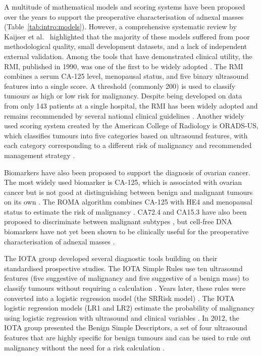 A multitude of mathematical models and scoring systems have been proposed over the years to support the preoperative characterisation of adnexal masses (Table~\ref{tab:intro:models}). However, a comprehensive systematic review by Kaijser et al.\ \cite{kaijserPresurgicalDiagnosisAdnexal2014} highlighted that the majority of these models suffered from poor methodological quality, small development datasets, and a lack of independent external validation. Among the tools that have demonstrated clinical utility, the \gls{RMI}, published in 1990, was one of the first to be widely adopted \cite{jacobsRiskMalignancyIndex1990}. The \gls{RMI} combines a serum CA-125 level, menopausal status, and five binary ultrasound features into a single score. A threshold (commonly 200) is used to classify tumours as high or low risk for malignancy. Despite being developed on data from only 143 patients at a single hospital, the \gls{RMI} has been widely adopted and remains recommended by several national clinical guidelines \cite{timmermanESGOISUOGIOTA2021}. Another widely used scoring system created by the American College of Radiology is \gls{ORADS}-US, which classifies tumours into five categories based on ultrasound features, with each category corresponding to a different risk of malignancy and recommended management strategy \cite{andreottiORADSUSRisk2020}. 

Biomarkers have also been proposed to support the diagnosis of ovarian cancer. The most widely used biomarker is CA-125, which is associated with ovarian cancer but is not good at distinguishing between benign and malignant tumours on its own \cite{mossRoleCA125Clinical2005}. The ROMA algorithm combines CA-125 with HE4 and menopausal status to estimate the risk of malignancy \cite{mooreUseMultipleNovel2008}. CA72.4 and CA15.3 have also been proposed to discriminate between malignant subtypes \cite{coosemansAddedValueSerum2025}, but cell-free DNA biomarkers have not yet been shown to be clinically useful for the preoperative characterisation of adnexal masses \cite{vandersticheleAddedValueCellfree2025}. 

The \gls{IOTA} group developed several diagnostic tools building on their standardised prospective studies. The \gls{IOTA} Simple Rules use ten ultrasound features (five suggestive of malignancy and five suggestive of a benign mass) to classify tumours without requiring a calculation \cite{timmermanSimpleUltrasoundbasedRules2008}. Years later, these rules were converted into a logistic regression model (the SRRisk model) \cite{timmermanPredictingRiskMalignancy2016}. The \gls{IOTA} logistic regression models (\gls{LR1} and \gls{LR2}) estimate the probability of malignancy using logistic regression with ultrasound and clinical variables \cite{timmermanLogisticRegressionModel2005}. In 2012, the IOTA group presented the Benign Simple Descriptors, a set of four ultrasound features that are highly specific for benign tumours and can be used to rule out malignancy without the need for a risk calculation \cite{ameyeClinicallyOrientedThreeStep2012}. 

